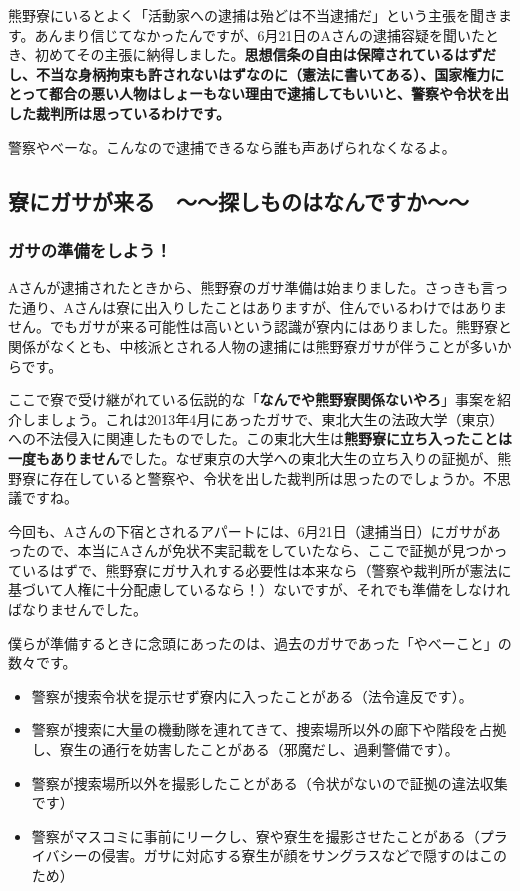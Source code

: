 熊野寮にいるとよく「活動家への逮捕は殆どは不当逮捕だ」という主張を聞きます。あんまり信じてなかったんですが、6月21日のAさんの逮捕容疑を聞いたとき、初めてその主張に納得しました。\textbf{思想信条の自由は保障されているはずだし、不当な身柄拘束も許されないはずなのに（憲法に書いてある）、国家権力にとって都合の悪い人物はしょーもない理由で逮捕してもいいと、警察や令状を出した裁判所は思っているわけです。}

警察やべーな。こんなので逮捕できるなら誰も声あげられなくなるよ。


\subsection{寮にガサが来る　〜〜探しものはなんですか〜〜}

\subsubsection{ガサの準備をしよう！}

Aさんが逮捕されたときから、熊野寮のガサ準備は始まりました。さっきも言った通り、Aさんは寮に出入りしたことはありますが、住んでいるわけではありません。でもガサが来る可能性は高いという認識が寮内にはありました。熊野寮と関係がなくとも、中核派とされる人物の逮捕には熊野寮ガサが伴うことが多いからです。

ここで寮で受け継がれている伝説的な「\textbf{なんでや熊野寮関係ないやろ}」事案を紹介しましょう。これは2013年4月にあったガサで、東北大生の法政大学（東京）への不法侵入に関連したものでした。この東北大生は\textbf{熊野寮に立ち入ったことは一度もありません}でした。なぜ東京の大学への東北大生の立ち入りの証拠が、熊野寮に存在していると警察や、令状を出した裁判所は思ったのでしょうか。不思議ですね。

今回も、Aさんの下宿とされるアパートには、6月21日（逮捕当日）にガサがあったので、本当にAさんが免状不実記載をしていたなら、ここで証拠が見つかっているはずで、熊野寮にガサ入れする必要性は本来なら（警察や裁判所が憲法に基づいて人権に十分配慮しているなら！）ないですが、それでも準備をしなければなりませんでした。

僕らが準備するときに念頭にあったのは、過去のガサであった「やべーこと」の数々です。

\begin{itemize}
  \item 警察が捜索令状を提示せず寮内に入ったことがある（法令違反です）。
  \item 警察が捜索に大量の機動隊を連れてきて、捜索場所以外の廊下や階段を占拠し、寮生の通行を妨害したことがある（邪魔だし、過剰警備です）。
  \item 警察が捜索場所以外を撮影したことがある（令状がないので証拠の違法収集です）
  \item 警察がマスコミに事前にリークし、寮や寮生を撮影させたことがある（プライバシーの侵害。ガサに対応する寮生が顔をサングラスなどで隠すのはこのため）
\end{itemize}

